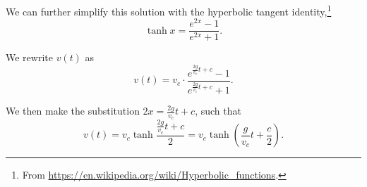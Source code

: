 \documentclass[../hw11]{subfiles}
\begin{document}
\def\idtanh#1{\frac{e^{2#1}-1}{e^{2#1}+1}}

We can further simplify this solution with the hyperbolic tangent identity,\footnote{From \url{https://en.wikipedia.org/wiki/Hyperbolic_functions}.}
\[\tanh{x}=\frac{e^{2x}-1}{e^{2x}+1}.\]

We rewrite $v(t)$ as
\[v(t)=v_c\cdot\frac{e^{\frac{2g}{v_c}t+c}-1}{e^{\frac{2g}{v_c}t+c}+1}.\]

We then make the substitution $2x=\frac{2g}{v_c}t+c$, such that
\[v(t)=v_c\tanh{\frac{\frac{2g}{v_c}t+c}{2}}=v_c\tanh{\left( \frac{g}{v_c}t+\frac{c}{2} \right)}.\]





\end{document}

